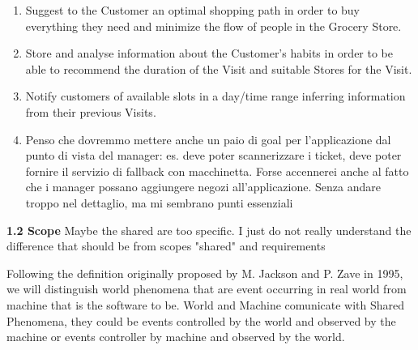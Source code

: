 \documentclass[a4paper, 10pt, oneside]{article}
\newcommand*{\lorenzo}[1]{\textcolor{BurntOrange}{#1}}
\begin{document}
\begin{enumerate}[label={G.\arabic{*}}]
    \begin{enumerate}[label={\ref{goal:visit}.\arabic{*}}]
        \item \label{goal:visit:path} Suggest to the Customer an optimal shopping path in order to buy everything they need and minimize the flow of people in the Grocery Store.
        \item Store and analyse information about the Customer's habits in order to be able to recommend the duration of the Visit and suitable Stores for the Visit.
        \item Notify customers of available slots in a day/time range inferring information from their previous Visits.
    \item \lorenzo{Penso che dovremmo mettere anche un paio di goal per l'applicazione dal punto di vista del manager: es. deve poter scannerizzare i ticket, deve poter fornire il servizio di fallback con macchinetta. Forse accennerei anche al fatto che i manager possano aggiungere negozi all'applicazione. Senza andare troppo nel dettaglio, ma mi sembrano punti essenziali}
    \end{enumerate}
\end{enumerate}

\pagebreak

{\large \textbf{1.2 Scope}}
\lorenzo{Maybe the shared are too specific. I just do not really understand the difference that should be from scopes "shared" and requirements}

\begin{flushleft}
Following the definition originally proposed by M. Jackson and P. Zave in 1995,
we will distinguish world phenomena that are event occurring in real world from machine
that is the software to be.
World and Machine comunicate with Shared Phenomena, they could be events controlled by the world and observed by the machine or events controller by machine and observed by the world.
\end{flushleft}
\end{document}
